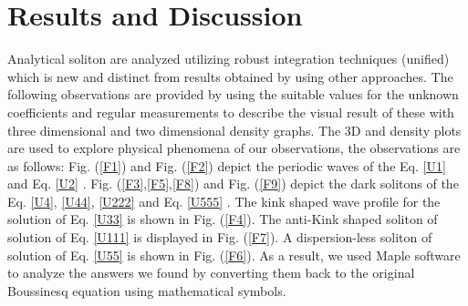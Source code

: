 \documentclass[10pt]{NSP1}
\numberwithin{equation}{section}
\begin{document}
\section{Results and Discussion}\label{s4}
Analytical soliton  are analyzed utilizing robust integration techniques (unified) which is new and distinct from results obtained by using other approaches. The following observations are provided by using the suitable values for the unknown coefficients and regular measurements to describe the visual result of these  with three dimensional and two dimensional density graphs. The 3D and density plots are used to explore physical phenomena of our observations, the observations are as follows: Fig. (\ref{F1}) and Fig. (\ref{F2}) depict the periodic waves of the Eq. \ref{U1} and Eq. \ref{U2} . Fig. (\ref{F3},\ref{F5},\ref{F8}) and Fig. (\ref{F9}) depict the dark solitons of the Eq. \ref{U4}, \ref{U44}, \ref{U222} and Eq. \ref{U555} . The kink shaped wave profile for the solution of Eq. \ref{U33} is shown in Fig. (\ref{F4}). The anti-Kink shaped soliton of solution of Eq. \ref{U111} is displayed in Fig. (\ref{F7}). A dispersion-less soliton of solution of Eq. \ref{U55} is shown in Fig. (\ref{F6}). As a result, we used Maple software to analyze the answers we found by converting them back to the original Boussinesq equation using mathematical symbols.
\end{document}
